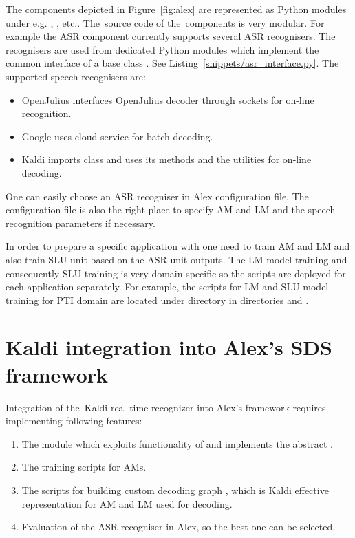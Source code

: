 The components depicted in Figure~\ref{fig:alex} are represented as Python modules under  e.g. ,  , etc..
The~source code of the~components is very modular.
For example the \ac{ASR} component currently supports several \ac{ASR} recognisers.
The recognisers are used from dedicated Python modules which implement the common interface of a base class . 
See Listing~\ref{snippets/asr_interface.py}.
The supported speech recognisers are:
\begin{itemize}
    \item OpenJulius  interfaces OpenJulius decoder through sockets for on-line recognition.
    \item Google  uses cloud service for batch decoding.
    \item Kaldi  imports  class and uses its methods and the utilities for on-line decoding.
\end{itemize}

One can easily choose an \ac{ASR} recogniser in Alex configuration file.
The configuration file is also the right place to specify \ac{AM} and \ac{LM} and the speech recognition parameters if necessary.

In order to prepare a specific application with  one need to train \ac{AM} and \ac{LM} and also train \ac{SLU} unit based on the \ac{ASR} unit outputs.
The \ac{LM} model training and consequently \ac{SLU} training is very domain specific so the scripts are deployed for each application separately.
For example, the scripts for \ac{LM} and \ac{SLU} model training for \ac{PTI} domain are located under directory  in directories  and .

\section[Kaldi integration into \acs{SDS} framework]{Kaldi integration into Alex's \acl{SDS} framework}
\label{sec:asrsds}

Integration of the~Kaldi real-time recognizer into Alex's framework requires implementing following features:
\begin{enumerate}
    \item The  module which exploits functionality of  and implements the abstract .
    \item The training scripts for \acp{AM}.
    \item The scripts for building custom decoding graph , which is Kaldi effective representation for \ac{AM} and \ac{LM} used for decoding. 
    \item Evaluation of the \ac{ASR} recogniser in Alex, so the best one can be selected.
\end{enumerate}

